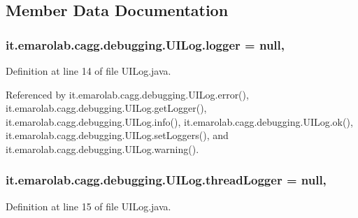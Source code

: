 \subsection{Member Data Documentation}
\hypertarget{classit_1_1emarolab_1_1cagg_1_1debugging_1_1UILog_a2c69fb044fed2a1bda3aa625f070799a}{
\subsubsection[{logger}]{ it.\-emarolab.\-cagg.\-debugging.\-U\-I\-Log.\-logger = null\hspace{0.3cm}{\ttfamily [static]}, {\ttfamily [private]}}}\label{classit_1_1emarolab_1_1cagg_1_1debugging_1_1UILog_a2c69fb044fed2a1bda3aa625f070799a}


Definition at line 14 of file U\-I\-Log.\-java.



Referenced by it.\-emarolab.\-cagg.\-debugging.\-U\-I\-Log.\-error(), it.\-emarolab.\-cagg.\-debugging.\-U\-I\-Log.\-get\-Logger(), it.\-emarolab.\-cagg.\-debugging.\-U\-I\-Log.\-info(), it.\-emarolab.\-cagg.\-debugging.\-U\-I\-Log.\-ok(), it.\-emarolab.\-cagg.\-debugging.\-U\-I\-Log.\-set\-Loggers(), and it.\-emarolab.\-cagg.\-debugging.\-U\-I\-Log.\-warning().

\hypertarget{classit_1_1emarolab_1_1cagg_1_1debugging_1_1UILog_acc6464d51b38d519ca85536302973fa6}{
\subsubsection[{thread\-Logger}]{ it.\-emarolab.\-cagg.\-debugging.\-U\-I\-Log.\-thread\-Logger = null\hspace{0.3cm}{\ttfamily [static]}, {\ttfamily [private]}}}\label{classit_1_1emarolab_1_1cagg_1_1debugging_1_1UILog_acc6464d51b38d519ca85536302973fa6}


Definition at line 15 of file U\-I\-Log.\-java.



